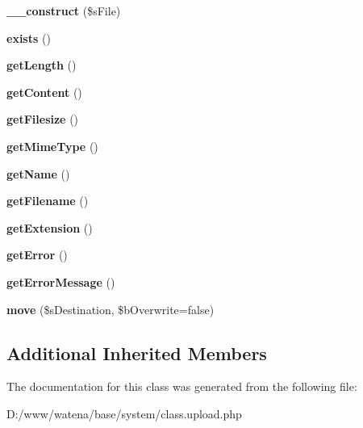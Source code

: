 \begin{DoxyCompactItemize}
\item 
\hypertarget{class_upload_ab61c7abdcb0b7cec8f1b63817d0c0511}{{\bfseries \-\_\-\-\_\-construct} (\$s\-File)}\label{class_upload_ab61c7abdcb0b7cec8f1b63817d0c0511}

\item 
\hypertarget{class_upload_a8f001128c9bf89d0a60ac73cf91fa7a8}{{\bfseries exists} ()}\label{class_upload_a8f001128c9bf89d0a60ac73cf91fa7a8}

\item 
\hypertarget{class_upload_a1f102a81f32dc48131d002f3a6af6fa8}{{\bfseries get\-Length} ()}\label{class_upload_a1f102a81f32dc48131d002f3a6af6fa8}

\item 
\hypertarget{class_upload_a8e8a7b44008c246f9cb524d20848d6c1}{{\bfseries get\-Content} ()}\label{class_upload_a8e8a7b44008c246f9cb524d20848d6c1}

\item 
\hypertarget{class_upload_ac7f044af763e84276c3611895bdc93b5}{{\bfseries get\-Filesize} ()}\label{class_upload_ac7f044af763e84276c3611895bdc93b5}

\item 
\hypertarget{class_upload_a2b7422db8b8c4e2dc8493704bceac3c0}{{\bfseries get\-Mime\-Type} ()}\label{class_upload_a2b7422db8b8c4e2dc8493704bceac3c0}

\item 
\hypertarget{class_upload_abaa5d50431cfc9350dd873f2e10844c5}{{\bfseries get\-Name} ()}\label{class_upload_abaa5d50431cfc9350dd873f2e10844c5}

\item 
\hypertarget{class_upload_ab9b2fcbe4e5f7214705aef920b26ca5c}{{\bfseries get\-Filename} ()}\label{class_upload_ab9b2fcbe4e5f7214705aef920b26ca5c}

\item 
\hypertarget{class_upload_a9058deee9f9146e0dc2f6c2f1d89b1e1}{{\bfseries get\-Extension} ()}\label{class_upload_a9058deee9f9146e0dc2f6c2f1d89b1e1}

\item 
\hypertarget{class_upload_a440dfb86f0914777acadc3c22f606de4}{{\bfseries get\-Error} ()}\label{class_upload_a440dfb86f0914777acadc3c22f606de4}

\item 
\hypertarget{class_upload_a06d937db71bc8b69637d4a7a7c30b323}{{\bfseries get\-Error\-Message} ()}\label{class_upload_a06d937db71bc8b69637d4a7a7c30b323}

\item 
\hypertarget{class_upload_afbbf9846ac4c1408f4159d77979a6d24}{{\bfseries move} (\$s\-Destination, \$b\-Overwrite=false)}\label{class_upload_afbbf9846ac4c1408f4159d77979a6d24}

\end{DoxyCompactItemize}
\subsection*{Additional Inherited Members}


The documentation for this class was generated from the following file\-:\begin{DoxyCompactItemize}
\item 
D\-:/www/watena/base/system/class.\-upload.\-php\end{DoxyCompactItemize}
